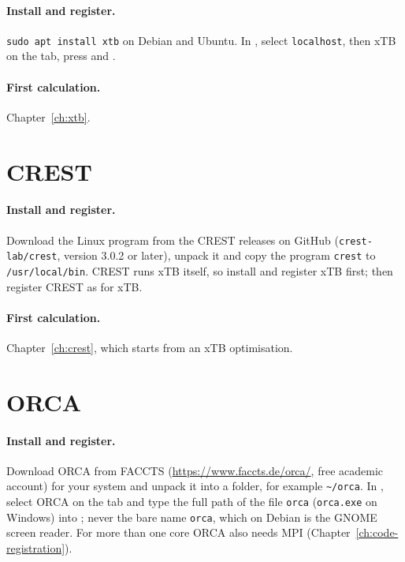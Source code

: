 \paragraph{Install and register.} \texttt{sudo apt install xtb} on Debian and Ubuntu. In , select \texttt{localhost}, then xTB on the  tab, press  and .

\paragraph{First calculation.} Chapter~\ref{ch:xtb}.

\section{CREST}
\label{sec:run-crest}
\paragraph{Install and register.} Download the Linux program from the CREST releases on GitHub (\texttt{crest-lab/crest}, version 3.0.2 or later), unpack it and copy the program \texttt{crest} to \texttt{/usr/local/bin}. CREST runs xTB itself, so install and register xTB first; then register CREST as for xTB.

\paragraph{First calculation.} Chapter~\ref{ch:crest}, which starts from an xTB optimisation.

\section{ORCA}
\label{sec:run-orca}
\paragraph{Install and register.} Download ORCA from FACCTS (\url{https://www.faccts.de/orca/}, free academic account) for your system and unpack it into a folder, for example \texttt{\textasciitilde/orca}. In , select ORCA on the  tab and type the full path of the file \texttt{orca} (\texttt{orca.exe} on Windows) into ; never the bare name \texttt{orca}, which on Debian is the GNOME screen reader. For more than one core ORCA also needs MPI (Chapter~\ref{ch:code-registration}).

